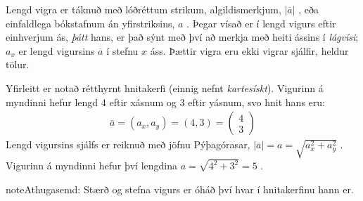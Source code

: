 \documentclass[a4paper,10pt,icelandic]{sphinxmanual}
\begin{document}
Lengd vigra er táknuð með lóðréttum strikum, algildismerkjum, \(|\overline{a}|\) , eða einfaldlega bókstafnum án yfirstriksins, \(a\) .
Þegar vísað er í lengd vigurs eftir einhverjum ás, \textit{þátt} hans, er það sýnt með því að merkja með heiti ássins í \textit{lágvísi}; \(a_x\) er lengd vigursins \(\overline{a}\) í stefnu \(x\) \sphinxhyphen{} áss.
Þættir vigra eru ekki vigrar sjálfir, heldur tölur.

\begin{figure}[htbp]
\centering

\noindent{}
\end{figure}

Yfirleitt er notað rétthyrnt hnitakerfi (einnig nefnt \textit{kartesískt}).
Vigurinn á myndinni hefur lengd 4 eftir x\sphinxhyphen{}ásnum og 3 eftir y\sphinxhyphen{}ásnum, svo hnit hans eru:
\begin{equation*}
\begin{split}\overline{a} = (a_x,a_y) = (4,3) = \begin{pmatrix} 4 \\ 3 \end{pmatrix}\end{split}
\end{equation*}
Lengd vigursins sjálfs er reiknuð með jöfnu Pýþagórasar, \(|\overline{a}| = a = \sqrt{a_x^2 + a_y^2}\) .
Vigurinn á myndinni hefur því lengdina \(a = \sqrt{4^2 + 3^2} = 5\) .

\begin{sphinxadmonition}{note}{Athugasemd:}
Stærð og stefna vigurs er óháð því hvar í hnitakerfinu hann er.
\end{sphinxadmonition}
\end{document}
